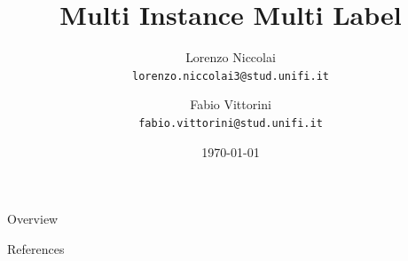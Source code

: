 \documentclass{beamer}
\title[MIML]{Multi Instance Multi Label}
\institute[]{{\large Machine Learning}\\\vspace{0.3cm}\textit{University of Florence, Department of Information Engineering}}
\author[L. Niccolai, F. Vittorini]
{\parbox[c]{1.5in}{Lorenzo Niccolai\\\texttt{\tiny lorenzo.niccolai3@stud.unifi.it}} \and 
\parbox[c]{1.5in}{Fabio Vittorini\\\texttt{\tiny fabio.vittorini@stud.unifi.it}}}
\date{\today}
\begin{document}
	
	
\frame[plain]{\titlepage} %

\usebackgroundtemplate
{
}



\begin{frame}{Overview}
	\tableofcontents
\end{frame}







\begin{frame}[allowframebreaks]{References}


\end{frame}
\end{document}
